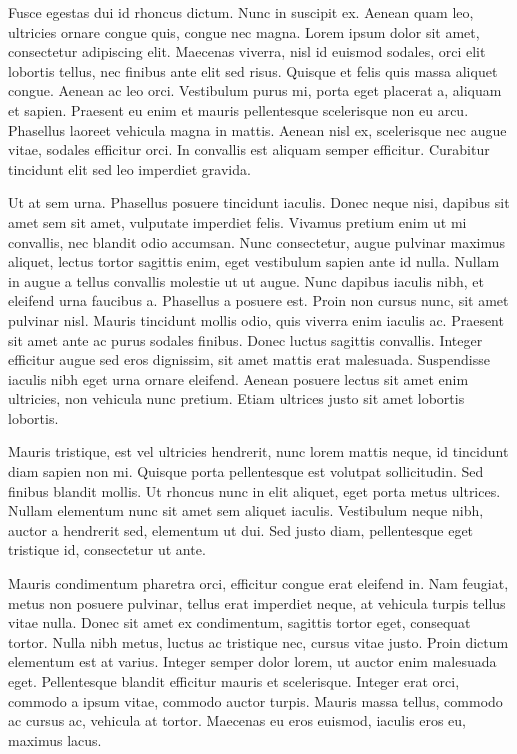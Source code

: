 Fusce egestas dui id rhoncus dictum. Nunc in suscipit ex. Aenean quam leo, ultricies ornare congue quis, congue nec magna. Lorem ipsum dolor sit amet, consectetur adipiscing elit. Maecenas viverra, nisl id euismod sodales, orci elit lobortis tellus, nec finibus ante elit sed risus. Quisque et felis quis massa aliquet congue. Aenean ac leo orci. Vestibulum purus mi, porta eget placerat a, aliquam et sapien. Praesent eu enim et mauris pellentesque scelerisque non eu arcu. Phasellus laoreet vehicula magna in mattis. Aenean nisl ex, scelerisque nec augue vitae, sodales efficitur orci. In convallis est aliquam semper efficitur. Curabitur tincidunt elit sed leo imperdiet gravida.

Ut at sem urna. Phasellus posuere tincidunt iaculis. Donec neque nisi, dapibus sit amet sem sit amet, vulputate imperdiet felis. Vivamus pretium enim ut mi convallis, nec blandit odio accumsan. Nunc consectetur, augue pulvinar maximus aliquet, lectus tortor sagittis enim, eget vestibulum sapien ante id nulla. Nullam in augue a tellus convallis molestie ut ut augue. Nunc dapibus iaculis nibh, et eleifend urna faucibus a. Phasellus a posuere est. Proin non cursus nunc, sit amet pulvinar nisl. Mauris tincidunt mollis odio, quis viverra enim iaculis ac. Praesent sit amet ante ac purus sodales finibus. Donec luctus sagittis convallis. Integer efficitur augue sed eros dignissim, sit amet mattis erat malesuada. Suspendisse iaculis nibh eget urna ornare eleifend. Aenean posuere lectus sit amet enim ultricies, non vehicula nunc pretium. Etiam ultrices justo sit amet lobortis lobortis.

Mauris tristique, est vel ultricies hendrerit, nunc lorem mattis neque, id tincidunt diam sapien non mi. Quisque porta pellentesque est volutpat sollicitudin. Sed finibus blandit mollis. Ut rhoncus nunc in elit aliquet, eget porta metus ultrices. Nullam elementum nunc sit amet sem aliquet iaculis. Vestibulum neque nibh, auctor a hendrerit sed, elementum ut dui. Sed justo diam, pellentesque eget tristique id, consectetur ut ante.

Mauris condimentum pharetra orci, efficitur congue erat eleifend in. Nam feugiat, metus non posuere pulvinar, tellus erat imperdiet neque, at vehicula turpis tellus vitae nulla. Donec sit amet ex condimentum, sagittis tortor eget, consequat tortor. Nulla nibh metus, luctus ac tristique nec, cursus vitae justo. Proin dictum elementum est at varius. Integer semper dolor lorem, ut auctor enim malesuada eget. Pellentesque blandit efficitur mauris et scelerisque. Integer erat orci, commodo a ipsum vitae, commodo auctor turpis. Mauris massa tellus, commodo ac cursus ac, vehicula at tortor. Maecenas eu eros euismod, iaculis eros eu, maximus lacus.

